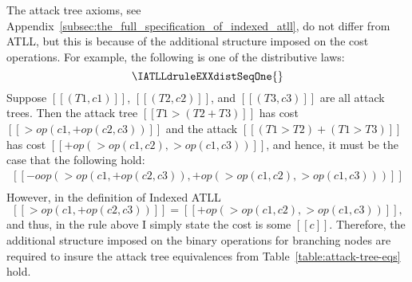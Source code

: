 The attack tree axioms, see
Appendix~\ref{subsec:the_full_specification_of_indexed_atll}, do not
differ from ATLL, but this is because of the additional structure
imposed on the cost operations.  For example, the following is one of
the distributive laws:
\[
\IATLLdruleEXXdistSeqOne{}
\]
Suppose $[[(T1,c1)]]$, $[[(T2,c2)]]$, and $[[(T3,c3)]]$ are all attack
trees.  Then the attack tree $[[T1 > (T2 + T3)]]$ has cost
$[[>op(c1,+op(c2,c3))]]$ and the attack $[[(T1 > T2) + (T1 > T3)]]$ has
cost $[[+op(>op(c1,c2),>op(c1,c3))]]$, and hence, it must be the case
that the following hold:
\[
\begin{array}{lll}
  [[-oop(>op(c1,+op(c2,c3)),+op(>op(c1,c2),>op(c1,c3)))]]\\
  [[-oop(+op(>op(c1,c2),>op(c1,c3)),>op(c1,+op(c2,c3)))]]
\end{array}  
\]
However, in the definition of Indexed ATLL
\[ [[>op(c1,+op(c2,c3))]] = [[+op(>op(c1,c2),>op(c1,c3))]], \] and thus,
in the rule above I simply state the cost is some $[[c]]$.  Therefore,
the additional structure imposed on the binary operations for
branching nodes are required to insure the attack tree equivalences
from Table~\ref{table:attack-tree-eqs} hold.

